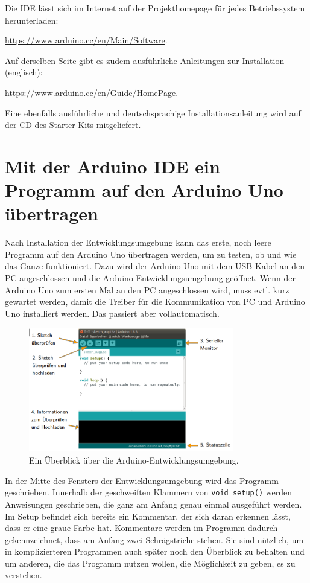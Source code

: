 Die IDE lässt sich im Internet auf der Projekthomepage für jedes Betriebssystem herunterladen:

\url{https://www.arduino.cc/en/Main/Software}.

Auf derselben Seite gibt es zudem ausführliche Anleitungen zur Installation (englisch):

\url{https://www.arduino.cc/en/Guide/HomePage}.

Eine ebenfalls ausführliche und deutschsprachige Installationsanleitung wird auf der CD des Starter Kits mitgeliefert.

\section{Mit der Arduino IDE ein Programm auf den Arduino Uno übertragen}
\label{sec:program_ide}

Nach Installation der Entwicklungsumgebung kann das erste, noch leere Programm auf den Arduino Uno übertragen werden, um zu testen, ob und wie das Ganze funktioniert. Dazu wird der Arduino Uno mit dem USB-Kabel an den PC angeschlossen und die Arduino-Entwicklungsumgebung geöffnet. Wenn der Arduino Uno zum ersten Mal an den PC angeschlossen wird, muss evtl. kurz gewartet werden, damit die Treiber für die Kommunikation von PC und Arduino Uno installiert werden. Das passiert aber vollautomatisch.

\begin{figure}[H]
	\centering
	\includegraphics[width=0.8\textwidth]{pics/ide-ueberblick.png}
	\caption{Ein Überblick über die Arduino-Entwicklungsumgebung.}
	\label{abb:ide}
\end{figure}

In der Mitte des Fensters der Entwicklungsumgebung wird das Programm geschrieben. Innerhalb der geschweiften Klammern von \texttt{void setup()} werden Anweisungen geschrieben, die ganz am Anfang genau einmal ausgeführt werden. Im Setup befindet sich bereits ein Kommentar, der sich daran erkennen lässt, dass er eine graue Farbe hat. Kommentare werden im Programm dadurch gekennzeichnet, dass am Anfang zwei Schrägstriche stehen. Sie sind nützlich, um in komplizierteren Programmen auch später noch den Überblick zu behalten und um anderen, die das Programm nutzen wollen, die Möglichkeit zu geben, es zu verstehen.

